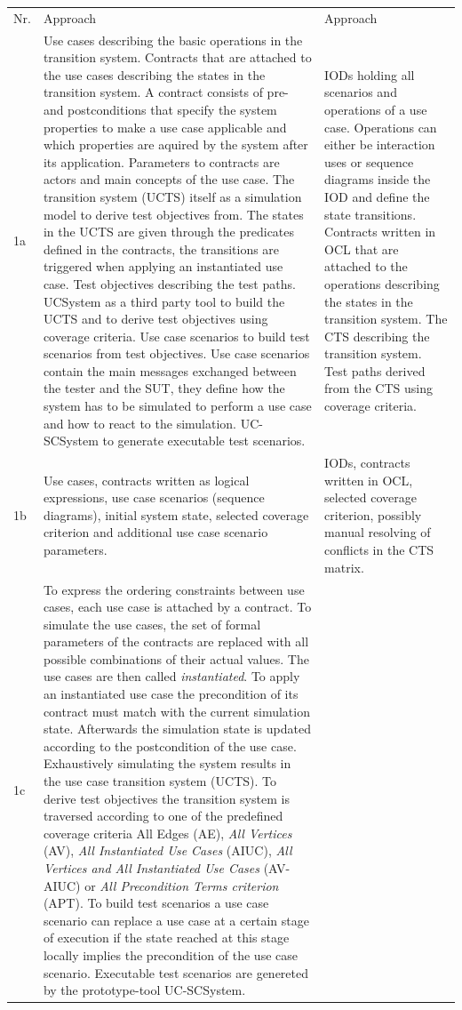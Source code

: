 \begin{longtable}[h]{p{0.5cm}p{}p{}}
	Nr. & Approach \cite{ClementineNebut2006} & Approach \cite{NajlaRaza2007} \\
	1a & 
	Use cases describing the basic operations in the transition system. Contracts that are attached to the use cases describing the states in the transition system. A contract consists of pre- and postconditions that specify the system properties to make a use case applicable and which properties are aquired by the system after its application. Parameters to contracts are actors and main concepts of the use case. The transition system (UCTS) itself as a simulation model to derive test objectives from. The states in the UCTS are given through the predicates defined in the contracts, the transitions are triggered when applying an instantiated use case. Test objectives describing the test paths. UCSystem as a third party tool to build the UCTS and to derive test objectives using coverage criteria. Use case scenarios to build test scenarios from test objectives. Use case scenarios contain the main messages exchanged between the tester and the SUT, they define how the system has to be simulated to perform a use case and how to react to the simulation. UC-SCSystem to generate executable test scenarios.  & 
	IODs holding all scenarios and operations of a use case. Operations can either be interaction uses or sequence diagrams inside the IOD and define the state transitions. Contracts written in OCL that are attached to the operations describing the states in the transition system. The CTS describing the transition system. Test paths derived from the CTS using coverage criteria.  \\
	1b & 
	Use cases, contracts written as logical expressions, use case scenarios (sequence diagrams), initial system state, selected coverage criterion and additional use case scenario parameters. & 
	IODs, contracts written in OCL, selected coverage criterion, possibly manual resolving of conflicts in the CTS matrix. \\
	1c &
	To express the ordering constraints between use cases, each use case is attached by a contract. To simulate the use cases, the set of formal parameters of the contracts are replaced with all possible combinations of their actual values. The use cases are then called \textit{instantiated}. To apply an instantiated use case the precondition of its contract must match with the current simulation state. Afterwards the simulation state is updated according to the postcondition of the use case. Exhaustively simulating the system results in the use case transition system (UCTS). To derive test objectives the transition system is traversed according to one of the predefined coverage criteria {All Edges} (AE), \textit{All Vertices} (AV), \textit{All Instantiated Use Cases} (AIUC), \textit{All Vertices and All Instantiated Use Cases} (AV-AIUC) or \textit{All Precondition Terms criterion} (APT). To build test scenarios a use case scenario can replace a use case at a certain stage of execution if the state reached at this stage locally implies the precondition of the use case scenario. Executable test scenarios are genereted by the prototype-tool UC-SCSystem. &

\end{longtable}
